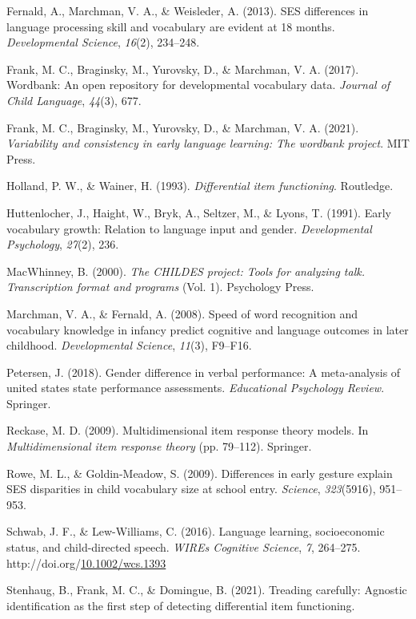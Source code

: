 \documentclass[10pt, letterpaper]{article}
\newenvironment{CSLReferences}%
  {}%
  {\par}
\begin{document}
\begin{CSLReferences}{1}{0}
\leavevmode\hypertarget{ref-fernald2013ses}{}%
Fernald, A., Marchman, V. A., \& Weisleder, A. (2013). SES differences
in language processing skill and vocabulary are evident at 18 months.
\emph{Developmental Science}, \emph{16}(2), 234--248.

\leavevmode\hypertarget{ref-frank2017}{}%
Frank, M. C., Braginsky, M., Yurovsky, D., \& Marchman, V. A. (2017).
Wordbank: An open repository for developmental vocabulary data.
\emph{Journal of Child Language}, \emph{44}(3), 677.

\leavevmode\hypertarget{ref-frank2021}{}%
Frank, M. C., Braginsky, M., Yurovsky, D., \& Marchman, V. A. (2021).
\emph{Variability and consistency in early language learning: The
wordbank project}. MIT Press.

\leavevmode\hypertarget{ref-holland1993differential}{}%
Holland, P. W., \& Wainer, H. (1993). \emph{Differential item
functioning}. Routledge.

\leavevmode\hypertarget{ref-huttenlocher1991early}{}%
Huttenlocher, J., Haight, W., Bryk, A., Seltzer, M., \& Lyons, T.
(1991). Early vocabulary growth: Relation to language input and gender.
\emph{Developmental Psychology}, \emph{27}(2), 236.

\leavevmode\hypertarget{ref-macwhinney2000childes}{}%
MacWhinney, B. (2000). \emph{The CHILDES project: Tools for analyzing
talk. Transcription format and programs} (Vol. 1). Psychology Press.

\leavevmode\hypertarget{ref-marchman2008speed}{}%
Marchman, V. A., \& Fernald, A. (2008). Speed of word recognition and
vocabulary knowledge in infancy predict cognitive and language outcomes
in later childhood. \emph{Developmental Science}, \emph{11}(3), F9--F16.

\leavevmode\hypertarget{ref-petersen2018gender}{}%
Petersen, J. (2018). Gender difference in verbal performance: A
meta-analysis of united states state performance assessments.
\emph{Educational Psychology Review}. Springer.

\leavevmode\hypertarget{ref-reckase2009}{}%
Reckase, M. D. (2009). Multidimensional item response theory models. In
\emph{Multidimensional item response theory} (pp. 79--112). Springer.

\leavevmode\hypertarget{ref-rowe2009differences}{}%
Rowe, M. L., \& Goldin-Meadow, S. (2009). Differences in early gesture
explain SES disparities in child vocabulary size at school entry.
\emph{Science}, \emph{323}(5916), 951--953.

\leavevmode\hypertarget{ref-schwab2016}{}%
Schwab, J. F., \& Lew-Williams, C. (2016). Language learning,
socioeconomic status, and child-directed speech. \emph{WIREs Cognitive
Science}, \emph{7}, 264--275.
http://doi.org/\href{https://doi.org/10.1002/wcs.1393}{10.1002/wcs.1393}

\leavevmode\hypertarget{ref-stenhaug2021treading}{}%
Stenhaug, B., Frank, M. C., \& Domingue, B. (2021). Treading carefully:
Agnostic identification as the first step of detecting differential item
functioning.

\end{CSLReferences}


\end{document}
